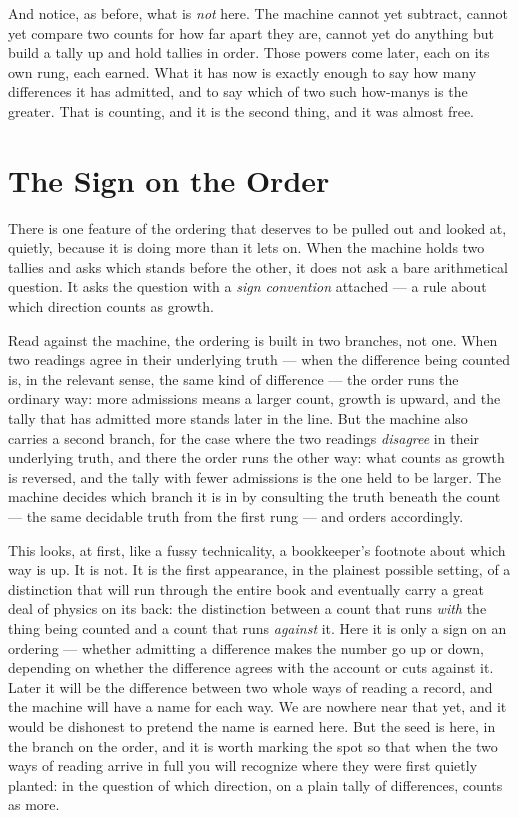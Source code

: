 And notice, as before, what is \emph{not} here. The machine cannot yet subtract, cannot yet compare two counts
for how far apart they are, cannot yet do anything but build a tally up and hold tallies in order. Those powers
come later, each on its own rung, each earned. What it has now is exactly enough to say how many differences it
has admitted, and to say which of two such how-manys is the greater. That is counting, and it is the second
thing, and it was almost free.

\section{The Sign on the Order}

There is one feature of the ordering that deserves to be pulled out and looked at, quietly, because it is doing
more than it lets on. When the machine holds two tallies and asks which stands before the other, it does not ask
a bare arithmetical question. It asks the question with a \emph{sign convention} attached --- a rule about which
direction counts as growth.

Read against the machine, the ordering is built in two branches, not one. When two readings agree in their
underlying truth --- when the difference being counted is, in the relevant sense, the same kind of difference ---
the order runs the ordinary way: more admissions means a larger count, growth is upward, and the tally that has
admitted more stands later in the line. But the machine also carries a second branch, for the case where the two
readings \emph{disagree} in their underlying truth, and there the order runs the other way: what counts as growth
is reversed, and the tally with fewer admissions is the one held to be larger. The machine decides which branch
it is in by consulting the truth beneath the count --- the same decidable truth from the first rung --- and
orders accordingly.

This looks, at first, like a fussy technicality, a bookkeeper's footnote about which way is up. It is not. It is
the first appearance, in the plainest possible setting, of a distinction that will run through the entire book
and eventually carry a great deal of physics on its back: the distinction between a count that runs \emph{with}
the thing being counted and a count that runs \emph{against} it. Here it is only a sign on an ordering ---
whether admitting a difference makes the number go up or down, depending on whether the difference agrees with
the account or cuts against it. Later it will be the difference between two whole ways of reading a record, and
the machine will have a name for each way. We are nowhere near that yet, and it would be dishonest to pretend the
name is earned here. But the seed is here, in the branch on the order, and it is worth marking the spot so that
when the two ways of reading arrive in full you will recognize where they were first quietly planted: in the
question of which direction, on a plain tally of differences, counts as more.

